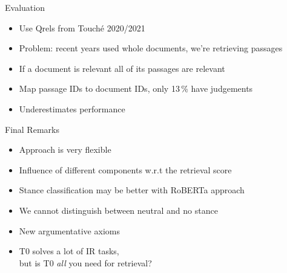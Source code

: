 \documentclass[english]{mlutalk}
\begin{document}
\begin{frame}{Evaluation}
    \begin{itemize}
      \item Use Qrels from Touché 2020/2021
      \item Problem: recent years used whole documents, we're retrieving passages
      \item If a document is relevant all of its passages are relevant
      \item Map passage IDs to document IDs, only 13\,\% have judgements
      \item Underestimates performance
    \end{itemize}
\end{frame}

\begin{frame}{Final Remarks}
    \begin{itemize}
        \item Approach is very flexible
        \item Influence of different components w.r.t the retrieval score
        \item Stance classification may be better with RoBERTa approach
        \item We cannot distinguish between neutral and no stance
        \item New argumentative axioms
        \item T0 solves a lot of IR tasks, \\
        but is T0 \emph{all} you need for retrieval?
    \end{itemize}
    \thankyou
\end{frame}

\appendix
\section{\appendixname}

\bibliographyframe
\end{document}

